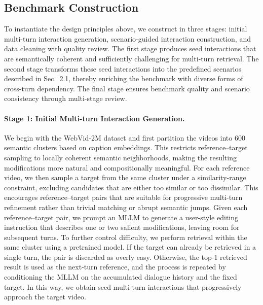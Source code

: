 
\subsection{Benchmark Construction} 
To instantiate the design principles above, we construct \Mybenchmark in three stages: initial multi-turn interaction generation, scenario-guided interaction construction, and data cleaning with quality review. The first stage produces seed interactions that are semantically coherent and sufficiently challenging for multi-turn retrieval. The second stage transforms these seed interactions into the predefined scenarios described in Sec.~2.1, thereby enriching the benchmark with diverse forms of cross-turn dependency. The final stage ensures benchmark quality and scenario consistency through multi-stage review.

\paragraph{Stage 1: Initial Multi-turn Interaction Generation.}
We begin with the WebVid-2M dataset and first partition the videos into 600 semantic clusters based on caption embeddings. This restricts reference--target sampling to locally coherent semantic neighborhoods, making the resulting modifications more natural and compositionally meaningful. For each reference video, we then sample a target from the same cluster under a similarity-range constraint, excluding candidates that are either too similar or too dissimilar. This encourages reference--target pairs that are suitable for progressive multi-turn refinement rather than trivial matching or abrupt semantic jumps. Given each reference--target pair, we prompt an MLLM to generate a user-style editing instruction that describes one or two salient modifications, leaving room for subsequent turns. To further control difficulty, we perform retrieval within the same cluster using a pretrained \task model. If the target can already be retrieved in a single turn, the pair is discarded as overly easy. Otherwise, the top-1 retrieved result is used as the next-turn reference, and the process is repeated by conditioning the MLLM on the accumulated dialogue history and the fixed target. In this way, we obtain seed multi-turn interactions that progressively approach the target video.

